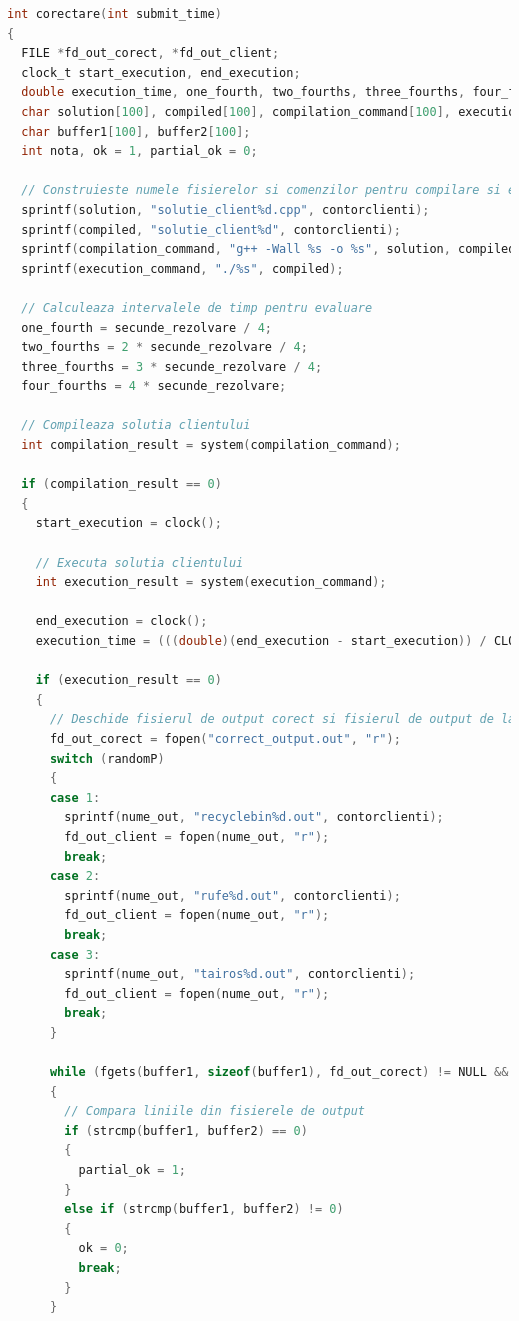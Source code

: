 \documentclass[runningheads]{llncs}
\begin{document}
\begin{lstlisting}[language=C, caption={Functia `corectare`}, label=corectare-function]
int corectare(int submit_time)
{
  FILE *fd_out_corect, *fd_out_client;
  clock_t start_execution, end_execution;
  double execution_time, one_fourth, two_fourths, three_fourths, four_fourths;
  char solution[100], compiled[100], compilation_command[100], execution_command[100], nume_out[100];
  char buffer1[100], buffer2[100];
  int nota, ok = 1, partial_ok = 0;
      
  // Construieste numele fisierelor si comenzilor pentru compilare si executie
  sprintf(solution, "solutie_client%d.cpp", contorclienti);
  sprintf(compiled, "solutie_client%d", contorclienti);
  sprintf(compilation_command, "g++ -Wall %s -o %s", solution, compiled);
  sprintf(execution_command, "./%s", compiled);
      
  // Calculeaza intervalele de timp pentru evaluare
  one_fourth = secunde_rezolvare / 4;
  two_fourths = 2 * secunde_rezolvare / 4;
  three_fourths = 3 * secunde_rezolvare / 4;
  four_fourths = 4 * secunde_rezolvare;
      
  // Compileaza solutia clientului
  int compilation_result = system(compilation_command);
      
  if (compilation_result == 0)
  {
    start_execution = clock();
      
    // Executa solutia clientului
    int execution_result = system(execution_command);
      
    end_execution = clock();
    execution_time = (((double)(end_execution - start_execution)) / CLOCKS_PER_SEC) * 10000.0;
      
    if (execution_result == 0)
    {
      // Deschide fisierul de output corect si fisierul de output de la client
      fd_out_corect = fopen("correct_output.out", "r");
      switch (randomP)
      {
      case 1:
        sprintf(nume_out, "recyclebin%d.out", contorclienti);
        fd_out_client = fopen(nume_out, "r");
        break;
      case 2:
        sprintf(nume_out, "rufe%d.out", contorclienti);
        fd_out_client = fopen(nume_out, "r");
        break;
      case 3:
        sprintf(nume_out, "tairos%d.out", contorclienti);
        fd_out_client = fopen(nume_out, "r");
        break;
      }
      
      while (fgets(buffer1, sizeof(buffer1), fd_out_corect) != NULL && fgets(buffer2, sizeof(buffer2), fd_out_client) != NULL)
      {
        // Compara liniile din fisierele de output
        if (strcmp(buffer1, buffer2) == 0)
        {
          partial_ok = 1;
        }
        else if (strcmp(buffer1, buffer2) != 0)
        {
          ok = 0;
          break;
        }
      }
      

\end{lstlisting}
\end{document}
